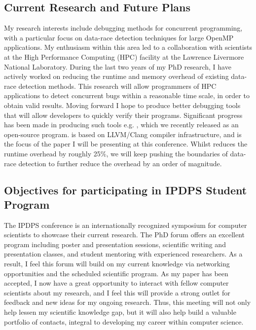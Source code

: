 \documentclass[svgnames,10pt]{article}
\begin{document}
\subsection{Current Research and Future Plans}
\vspace{-5pt}
My research interests include debugging methods for concurrent programming,
with a particular focus on data-race detection techniques for large OpenMP
applications.
%
My enthusiasm within this area led to a collaboration with scientists at the
High Performance Computing (HPC) facility at the Lawrence Livermore National
Laboratory.
%
During the last two years of my PhD research, I have actively worked on
reducing the runtime and memory overhead of existing data-race detection
methods.
%
This research will allow programmers of HPC applications to detect concurrent
bugs within a reasonable time scale, in order to obtain valid results.
%
Moving forward I hope to produce better debugging tools that will allow
developers to quickly verify their programs.
%
Significant progress has been made in producing such tools e.g. \archer, which we
recently released as an open-source program.
%
\archer is based on LLVM/Clang compiler infrastructure, and is the focus of
the paper I will be presenting at this conference.
%
Whilst \archer reduces the runtime overhead by roughly 25\%, we will keep
pushing the boundaries of data-race detection to further reduce the
overhead by an order of magnitude.

\vspace{-5pt}
\subsection{Objectives for participating in IPDPS Student Program}
\vspace{-5pt}
The IPDPS conference is an internationally recognized symposium for computer
scientists to showcase their current research.
%
The PhD forum offers an excellent program including poster and presentation
sessions, scientific writing and presentation classes, and student mentoring
with experienced researchers.
%
As a result, I feel this forum will build on my current knowledge via
networking opportunities and the scheduled scientific program.
%
As my paper has been accepted, I now have a great opportunity to interact with
fellow computer scientists about my research, and I feel this will provide a
strong outlet for feedback and new ideas for my ongoing research.
%
Thus, this meeting will not only help lessen my scientific knowledge gap, but
it will also help build a valuable portfolio of contacts, integral to
developing my career within computer science.
\end{document}
